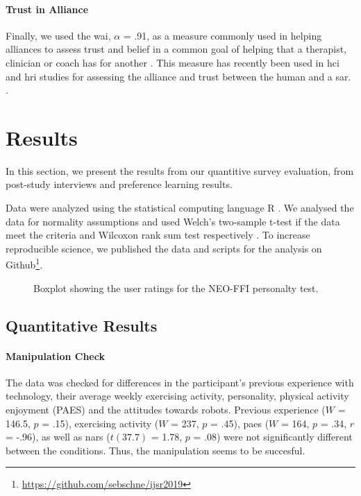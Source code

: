 \documentclass[twocolumn]{svjour3}          %
\begin{document}
\hypertarget{alliance-and-trust-1}{%
\paragraph{Trust in Alliance}\label{alliance-and-trust-1}}

Finally, we used the \gls{wai}, \(\alpha\) = .91,
as a measure commonly used in helping alliances to assess trust and
belief in a common goal of helping that a therapist, clinician or coach
has for another \autocite{horvath1989development}. This measure has
recently been used in \gls{hci} and \gls{hri} studies for assessing the alliance
and trust between the human and a \gls{sar}.
\autocite{bickmore2005establishing,kidd2008robots}.

\hypertarget{results}{%
\section{\texorpdfstring{Results
\label{adaptation:sec:results}}{Results }}\label{results}}
In this section, we present the results from our quantitive survey evaluation, from post-study interviews and preference learning results.

Data were analyzed using the statistical computing language R
\autocite{R2013}. We analysed the data for normality assumptions and used
Welch's two-sample t-test if the data meet the criteria and Wilcoxon
rank sum test respectively
\autocite{welch1947generalization,wilcoxon1945individual}. To increase
reproducible science, we published the
data and scripts for the analysis on Github\footnote{\url{https://github.com/sebschne/ijsr2019}}.

\begin{figure}[bt!]
\centering
 \caption{\label{fig:adapt:neoffi} Boxplot showing the user ratings for the NEO-FFI personalty test.}\label{fig:unnamed-chunk-4}
\end{figure}
\subsection{Quantitative Results}
\hypertarget{manipulation-check}{%
\paragraph{Manipulation Check}\label{manipulation-check}}

The data was checked for differences in the participant's previous
experience with technology, their average weekly exercising activity, personality, physical activity enjoyment (PAES) and
the attitudes towards robots. Previous experience (\(W\) = 146.5, \(p\)
= .15), exercising activity (\(W\) = 237, \(p\) = .45), \gls{paes} (\(W\) = 164, \(p\) = .34, \(r\) = -.96), as well as \gls{nars}
(\(t(37.7)\) = 1.78, \(p\) = .08) were not significantly different between the conditions. Thus, the manipulation seems to be succesful. 
\end{document}
